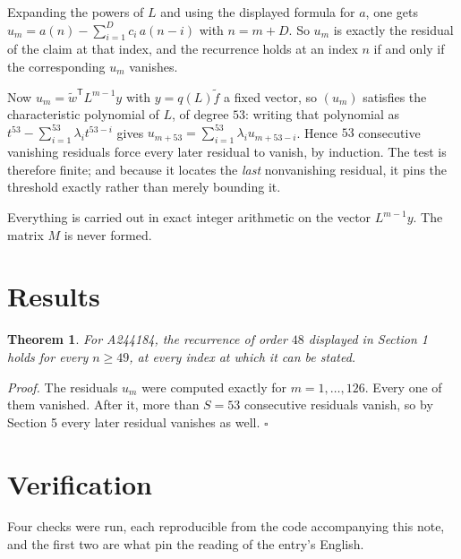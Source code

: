 \documentclass[11pt]{article}
\newtheorem{theorem}{Theorem}
\theoremstyle{definition}
\begin{document}
Expanding the powers of $L$ and using the displayed formula for $a$, one gets $u_m = a(n) - \sum_{i=1}^{D} c_i\,a(n-i)$ with $n = m + D$. So $u_m$ is exactly the residual of the claim at that index, and the recurrence holds at an index $n$ if and only if the corresponding $u_m$ vanishes.

Now $u_m = \tilde w^{\mathsf T} L^{m-1} y$ with $y = q(L)\tilde f$ a fixed vector, so $(u_m)$ satisfies the characteristic polynomial of $L$, of degree $53$: writing that polynomial as $t^{53} - \sum_{i=1}^{53} \lambda_i t^{53-i}$ gives $u_{m+53} = \sum_{i=1}^{53} \lambda_i u_{m+53-i}$. Hence $53$ consecutive vanishing residuals force every later residual to vanish, by induction. The test is therefore finite; and because it locates the {\itshape last} nonvanishing residual, it pins the threshold exactly rather than merely bounding it.

Everything is carried out in exact integer arithmetic on the vector $L^{m-1}y$. The matrix $M$ is never formed.

\section{Results}

\begin{theorem} For A244184, the recurrence of order $48$ displayed in Section 1 holds for every $n \ge 49$, at every index at which it can be stated.\end{theorem}

{\itshape Proof.} The residuals $u_m$ were computed exactly for $m = 1,\dots,126$. Every one of them vanished. After it, more than $S = 53$ consecutive residuals vanish, so by Section 5 every later residual vanishes as well. $\square$

\section{Verification}

Four checks were run, each reproducible from the code accompanying this note, and the first two are what pin the reading of the entry's English.
\end{document}
